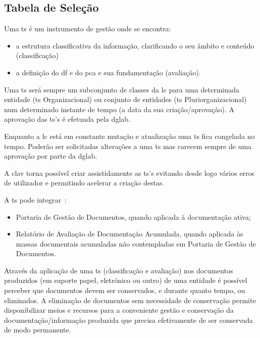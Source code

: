\subsection{Tabela de Seleção}

Uma \acrfull{ts} é um instrumento de gestão onde se encontra:~\cite{tsDef}
\begin{itemize}
    \item a estrutura classificativa da informação, clarificando o seu âmbito e conteúdo (classificação)
    \item a definição do \acrlong{df} e do \acrlong{pca} e sua fundamentação (avaliação).
\end{itemize}

Uma \acrshort{ts} será sempre um subconjunto de classes da \acrshort{lc} para uma determinada 
entidade (\acrshort{ts} Organizacional) ou conjunto de entidades (\acrshort{ts} Pluriorganizacional) 
num determinado instante de tempo (a data da sua criação/aprovação). 
A aprovação das \acrshort{ts}'s é efetuada pela \acrshort{dglab}.

Enquanto a \acrshort{lc} está em constante mutação e atualização uma \acrshort{ts} fica congelada no tempo.
Poderão ser solicitadas alterações a uma \acrshort{ts} mas carecem sempre de uma aprovação por parte da \acrshort{dglab}.


A \acrshort{clav} torna possível criar assistidamente as \acrshort{ts}'s evitando desde logo vários erros de 
utilizador e permitindo acelerar a criação destas.

A \acrshort{ts} pode integrar~\cite{tsDef}:
\begin{itemize}
    \item Portaria de Gestão de Documentos, quando aplicada à documentação ativa;
    \item Relatório  de  Avaliação  de  Documentação  Acumulada, quando aplicada às massas documentais acumuladas 
    não contempladas em Portaria de Gestão de Documentos.
\end{itemize}

Através da aplicação de uma \acrshort{ts} (classificação e avaliação) nos documentos produzidos 
(em suporte papel, eletrónico ou outro) de uma entidade é possível perceber que documentos devem ser conservados, 
e durante quanto tempo, ou eliminados. A eliminação de documentos sem necessidade de conservação permite 
disponibilizar meios e recursos para a conveniente gestão e conservação da documentação/informação produzida 
que precisa efetivamente de ser conservada de modo permanente.~\cite{ts}

